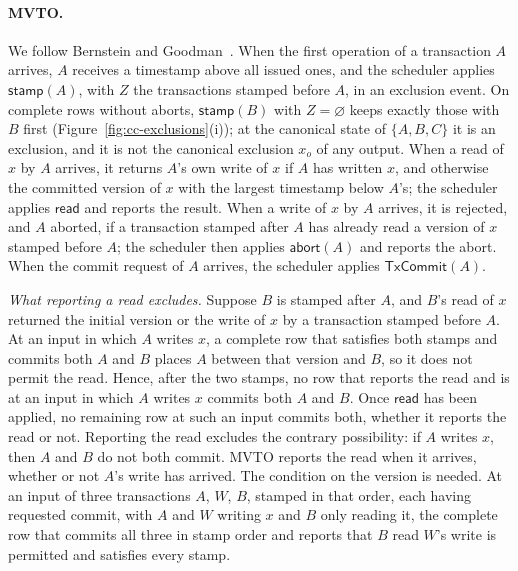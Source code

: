 \paragraph{MVTO.}
We follow Bernstein and Goodman~\cite{bernstein1981concurrency}.  When the
first operation of a transaction $A$ arrives, $A$ receives a timestamp above
all issued ones, and the scheduler applies $\mathsf{stamp}(A)$, with $Z$ the
transactions stamped before $A$, in an exclusion event.  On complete rows
without aborts, $\mathsf{stamp}(B)$ with $Z=\varnothing$ keeps exactly those
with $B$ first (Figure~\ref{fig:cc-exclusions}(i)); at the canonical state of
$\{A,B,C\}$ it is an exclusion, and it is not the canonical exclusion $x_o$ of any output.  When
a read of $x$ by $A$ arrives, it returns $A$'s own write of $x$ if $A$ has
written $x$, and otherwise the committed version of $x$ with the largest
timestamp below $A$'s; the scheduler applies $\mathsf{read}$ and reports the
result.  When a write of $x$ by $A$ arrives, it is rejected, and $A$ aborted,
if a transaction stamped after $A$ has already read a version of $x$ stamped
before $A$; the scheduler then applies $\mathsf{abort}(A)$ and reports the
abort.  When the commit request of $A$ arrives, the scheduler applies
$\mathsf{TxCommit}(A)$.

\emph{What reporting a read excludes.}  Suppose $B$ is stamped after $A$, and
$B$'s read of $x$ returned the initial version or the write of $x$ by a
transaction stamped before $A$.  At an input in which $A$ writes $x$, a
complete row that satisfies both stamps and commits both $A$ and $B$ places $A$
between that version and $B$, so it does not permit the read.  Hence, after the
two stamps, no row that reports the read and is at an input in which $A$
writes $x$ commits both $A$ and $B$.  Once $\mathsf{read}$ has been applied, no
remaining row at such an input commits both, whether it reports the read or
not.  Reporting the read excludes the contrary possibility: if $A$ writes $x$, then $A$
and $B$ do not both commit.  MVTO reports the read when it arrives, whether or not
$A$'s write has arrived.  The condition on the version is needed.  At an input of three
transactions $A$, $W$, $B$, stamped in that order, each having requested
commit, with $A$ and $W$ writing $x$ and $B$ only reading it, the complete row
that commits all three in stamp order and reports that $B$ read $W$'s write is
permitted and satisfies every stamp.

